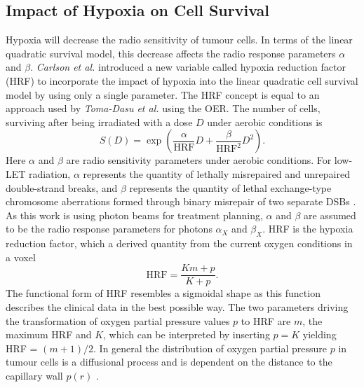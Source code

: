 \subsection{Impact of Hypoxia on Cell Survival}
Hypoxia will decrease the radio sensitivity of tumour cells. In terms of the linear quadratic survival model, this decrease affects the radio response parameters $\alpha$ and $\beta$. \textit{Carlson et al.} \cite{pmid17022202} introduced a new variable called hypoxia reduction factor (HRF) to incorporate the impact of hypoxia into the linear quadratic cell survival model by using only a single parameter. The HRF concept is equal to an approach used by \textit{Toma-Dasu et al.} \cite{pmid21871003} using the OER. The number of cells, surviving after being irradiated with a dose $D$ under aerobic conditions is
\begin{equation}
S(D) = \exp\left(\frac{\alpha}{\mathrm{HRF}}D + \frac{\beta}{\mathrm{HRF}^2}D^2\right).
\end{equation}
Here $\alpha$ and $\beta$ are radio sensitivity parameters under aerobic conditions. For low-LET radiation, $\alpha$ represents the quantity of lethally misrepaired and unrepaired double-strand breaks, and $\beta$ represents the quantity of lethal exchange-type chromosome aberrations formed through binary misrepair of two separate DSBs \cite{pmid18363426}. As this work is using photon beams for treatment planning, $\alpha$ and $\beta$ are assumed to be the radio response parameters for photons $\alpha_X$ and $\beta_X$. HRF is the hypoxia reduction factor, which a derived quantity from the current oxygen conditions in a voxel \cite{pmid21183291}
\begin{equation}\label{eq:hrfmodel}
\mathrm{HRF} = \frac{Km + p}{K+p}.
\end{equation}
The functional form of HRF resembles a sigmoidal shape as this function describes the clinical data in the best possible way. The two parameters driving the transformation of oxygen partial pressure values $p$ to HRF are $m$, the maximum HRF and $K$, which can be interpreted by inserting $p=K$ yielding HRF = $(m+1)/2$. In general the distribution of oxygen partial pressure $p$ in tumour cells is a diffusional process and is dependent on the distance to the capillary wall $p(r)$ \cite{pmid5067983}.
